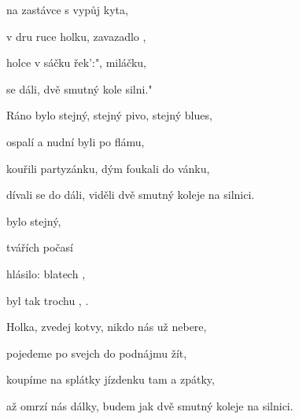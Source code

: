 

\zs
{} na zastávce s vypůj kyta,

v dru ruce holku,  zavazadlo ,

 holce v sáčku řek':", miláčku,

 se  dáli,  dvě smutný kole   silni."
\ks

\zs
Ráno bylo stejný, stejný pivo, stejný blues,

ospalí a nudní byli po flámu,

kouřili partyzánku, dým foukali do vánku,

dívali se do dáli, viděli dvě smutný koleje na silnici.
\ks

\zr
{} bylo stejný,   

 tvářích počasí    

 hlásilo:  blatech ,

 byl tak trochu , .
\kr

\zs
Holka, zvedej kotvy, nikdo nás už nebere,

pojedeme po svejch do podnájmu žít,

koupíme na splátky jízdenku tam a zpátky,

až omrzí nás dálky, budem jak dvě smutný koleje na silnici.
\ks

\zr	\kr

\kp






















